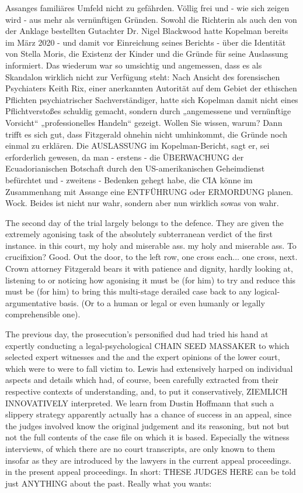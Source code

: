 \begin{multicols}{2}
{Assanges familiäres Umfeld nicht zu gefährden. Völlig
frei und - wie sich zeigen wird - aus mehr als vernünftigen Gründen. Sowohl die Richterin als auch den von der
Anklage bestellten Gutachter Dr. Nigel Blackwood hatte Kopelman bereits im März 2020 - und damit vor Einreichung seines Berichts - über die Identität von Stella
Moris, die Existenz der Kinder und die Gründe für seine
Auslassung informiert. Das wiederum war so umsichtig
und angemessen, dass es als Skandalon wirklich nicht
zur Verfügung steht: Nach Ansicht des forensischen Psychiaters Keith Rix, einer anerkannten Autorität auf dem
Gebiet der ethischen Pflichten psychiatrischer Sachverständiger, hatte sich Kopelman damit nicht eines
Pflichtverstoßes schuldig gemacht, sondern durch „angemessene und vernünftige Vorsicht“ „professionelles
Handeln“ gezeigt.\textCR
Wollen Sie wissen, warum? Dann trifft es sich gut, dass
Fitzgerald ohnehin nicht umhinkommt, die Gründe
noch einmal zu erklären. Die AUSLASSUNG im Kopelman-Bericht, sagt er, sei erforderlich gewesen, da man
- erstens - die ÜBERWACHUNG der Ecuadorianischen
Botschaft durch den US-amerikanischen Geheimdienst
befürchtet und - zweitens - Bedenken gehegt habe, die
CIA könne im Zusammenhang mit Assange eine ENTFÜHRUNG oder ERMORDUNG planen.\textCR
Wock. Beides ist nicht nur wahr, sondern aber nun wirklich sowas von wahr.}



The second day of the trial largely belongs to the defence. They are given the extremely agonising task of
the absolutely subterranean verdict of the first instance.
in this court, my holy and miserable ass.
my holy and miserable ass. To crucifixion?
Good. Out the door, to the left row, one cross each...
one cross, next. Crown attorney Fitzgerald bears it
with patience and dignity, hardly looking at, listening to or noticing how agonising it must be (for him) to try and reduce this
must be (for him) to bring this multi-stage derailed case back to any logical-argumentative basis.
(Or to a human or legal or even humanly or legally comprehensible one).

The previous day, the prosecution's personified dud had tried his hand at expertly conducting a legal-psychological CHAIN SEED MASSAKER
to which selected expert witnesses and the
and the expert opinions of the lower court, which were to
were to fall victim to. Lewis had extensively harped on individual aspects and details which had, of course, been carefully extracted from their respective contexts of understanding, and, to put it conservatively, ZIEMLICH
INNOVATIVELY interpreted. We learn from
Dustin Hoffmann that such a slippery strategy
apparently actually has a chance of success in an appeal, since the judges involved know the original judgement and its reasoning, but not
but not the full contents of the case file on which it is based. Especially the witness interviews,
of which there are no court transcripts, are only known to them insofar as they are introduced by the lawyers in the current appeal proceedings.
in the present appeal proceedings.
In short: THESE JUDGES HERE can be told just ANYTHING about the past. Really what you
wants:


\end{multicols}
